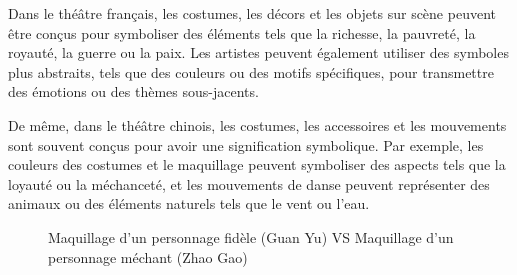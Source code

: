 \documentclass[UTF8,a4paper,12pt]{ctexart}
\numberwithin{equation}{section}
\begin{document}
Dans le théâtre français, les costumes, les décors et les objets sur scène peuvent être conçus pour symboliser des éléments tels que la richesse, la pauvreté, la royauté, la guerre ou la paix. Les artistes peuvent également utiliser des symboles plus abstraits, tels que des couleurs ou des motifs spécifiques, pour transmettre des émotions ou des thèmes sous-jacents.

De même, dans le théâtre chinois, les costumes, les accessoires et les mouvements sont souvent conçus pour avoir une signification symbolique. Par exemple, les couleurs des costumes et le maquillage peuvent symboliser des aspects tels que la loyauté ou la méchanceté, et les mouvements de danse peuvent représenter des animaux ou des éléments naturels tels que le vent ou l'eau.

\begin{figure}[h!]
\centering
{}%
\hspace*{0.5cm} %
\captionsetup{justification=centering, singlelinecheck=false}
\caption{Maquillage d'un personnage fidèle (Guan Yu) VS Maquillage d'un personnage méchant (Zhao Gao)}

\end{figure}
\end{document}

